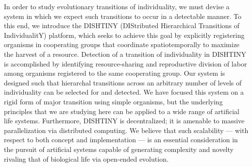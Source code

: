 In order to study evolutionary transitions of individuality, we must devise a system in which we expect such transitions to occur in a detectable manner.
To this end, we introduce the DISHTINY (DIStributed Hierarchical Transitions of IndividualitY) platform, which seeks to achieve this goal by explicitly registering organisms in cooperating groups that coordinate spatiotemporally to maximize the harvest of a resource.
Detection of a transition of individuality in DISHTINY is accomplished by identifying resource-sharing and reproductive division of labor among organisms registered to the same cooperating group.
Our system is designed such that hierarchal transitions across an arbitrary number of levels of individuality can be selected for and detected.
We have focused this system on a rigid form of major transition using simple organisms, but the underlying principles that we are studying here can be applied to a wide range of artificial life systems.
Furthermore, DISHTINY is decentralized;
it is amenable to massive parallelization via distributed computing.
We believe that such scalability --- with respect to both concept and implementation --- is an essential consideration in the pursuit of artificial systems capable of generating complexity and novelty rivaling that of biological life via open-ended evolution.

